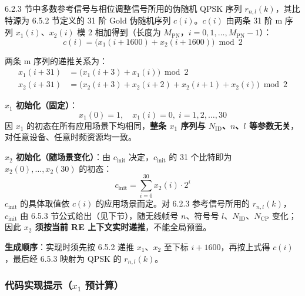 \documentclass[11pt,a4paper]{ctexart}
\begin{document}
6.2.3 节中多数参考信号与相位调整信号所用的伪随机 QPSK 序列 $r_{n,l}(k)$，其比特源为 6.5.2 节定义的 31 阶 Gold 伪随机序列 $c(i)$。$c(i)$ 由两条 31 阶 m 序列 $x_1(i)$、$x_2(i)$ 模 2 相加得到（长度为 $M_{\mathrm{PN}}$，$i=0,1,\ldots,M_{\mathrm{PN}}-1$）：
\begin{equation}
c(i) = \bigl(x_1(i+1600) + x_2(i+1600)\bigr) \bmod 2
\end{equation}

两条 m 序列的递推关系为：
\begin{align}
x_1(i+31) &= \bigl(x_1(i+3) + x_1(i)\bigr) \bmod 2 \\
x_2(i+31) &= \bigl(x_2(i+3) + x_2(i+2) + x_2(i+1) + x_2(i)\bigr) \bmod 2
\end{align}

\textbf{$x_1$ 初始化（固定）}：
\begin{equation}
x_1(0)=1,\quad x_1(i)=0,\; i=1,2,\ldots,30
\end{equation}
因 $x_1$ 的初态在所有应用场景下均相同，\textbf{整条 $x_1$ 序列与 $N_{\mathrm{ID}}$、$n$、$l$ 等参数无关}，对任意设备、任意时频资源均一致。

\textbf{$x_2$ 初始化（随场景变化）}：由 $c_{\mathrm{init}}$ 决定，$c_{\mathrm{init}}$ 的 31 个比特即为 $x_2(0),\ldots,x_2(30)$ 的初态：
\begin{equation}
c_{\mathrm{init}} = \sum_{i=0}^{30} x_2(i)\cdot 2^i
\end{equation}
$c_{\mathrm{init}}$ 的具体取值依 $c(i)$ 的应用场景而定。对 6.2.3 参考信号所用的 $r_{n,l}(k)$，$c_{\mathrm{init}}$ 由 6.5.3 节公式给出（见下节），随无线帧号 $n$、符号号 $l$、$N_{\mathrm{ID}}$、$N_{\mathrm{CP}}$ 变化；因此 \textbf{$x_2$ 须按当前 RE 上下文实时递推}，不能全局预置。

\textbf{生成顺序}：实现时须先按 6.5.2 递推 $x_1$、$x_2$ 至下标 $i+1600$，再按上式得 $c(i)$，最后经 6.5.3 映射为 QPSK 的 $r_{n,l}(k)$。

\subsubsection{代码实现提示（$x_1$ 预计算）}
\end{document}
